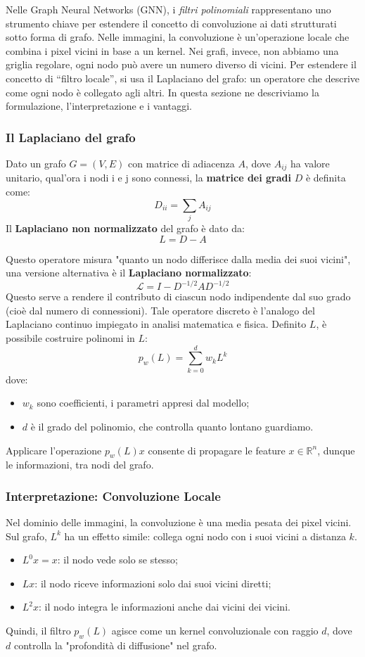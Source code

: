 Nelle Graph Neural Networks (GNN), i \textit{filtri polinomiali} rappresentano uno strumento chiave per estendere il concetto di convoluzione ai dati strutturati sotto forma di grafo. Nelle immagini, la convoluzione è un’operazione locale che combina i pixel vicini in base a un kernel. Nei grafi, invece, non abbiamo una griglia regolare, ogni nodo può avere un numero diverso di vicini. Per estendere il concetto di “filtro locale”, si usa il Laplaciano del grafo: un operatore che descrive come ogni nodo è collegato agli altri. In questa sezione ne descriviamo la formulazione, l’interpretazione e i vantaggi.

\subsubsection{Il Laplaciano del grafo}

Dato un grafo \( G = (V, E) \) con matrice di adiacenza \( A \), dove \(A_{ij}\) ha valore unitario, qual'ora i nodi i e j sono connessi, la \textbf{matrice dei gradi} \( D \) è definita come:
\[
  D_{ii} = \sum_{j} A_{ij}
\]
Il \textbf{Laplaciano non normalizzato} del grafo è dato da:
\[
  L = D - A
\]

Questo operatore misura "quanto un nodo differisce dalla media dei suoi vicini", una versione alternativa è il \textbf{Laplaciano normalizzato}:
\[
  \mathcal{L} = I - D^{-1/2} A D^{-1/2}
\]
Questo serve a rendere il contributo di ciascun nodo indipendente dal suo grado (cioè dal numero di connessioni). Tale operatore discreto è l’analogo del Laplaciano continuo impiegato in analisi matematica e fisica. Definito \( L \), è possibile costruire polinomi in \( L \):
\[
  p_w(L) = \sum_{k=0}^d w_k L^k
\]
dove:
\begin{itemize}
  \item \( w_k \) sono coefficienti, i parametri appresi dal modello;
  \item \( d \) è il grado del polinomio, che controlla quanto lontano guardiamo.
\end{itemize}
Applicare l’operazione \( p_w(L) x \) consente di propagare le feature \( x \in \mathbb{R}^n \), dunque le informazioni, tra nodi del grafo.

\subsubsection{Interpretazione: Convoluzione Locale}
Nel dominio delle immagini, la convoluzione è una media pesata dei pixel vicini. Sul grafo, $L^k$ ha un effetto simile: collega ogni nodo con i suoi vicini a distanza $k$.
\begin{itemize}
  \item \( L^0 x = x \): il nodo vede solo se stesso;
  \item \( Lx \): il nodo riceve informazioni solo dai suoi vicini diretti;
  \item \( L^2 x \): il nodo integra le informazioni anche dai vicini dei vicini.
\end{itemize}
Quindi, il filtro $p_w(L)$ agisce come un kernel convoluzionale con raggio $d$, dove $d$ controlla la "profondità di diffusione" nel grafo.

